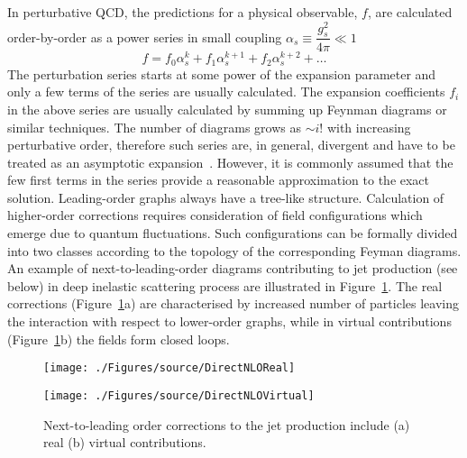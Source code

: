 In perturbative QCD, the predictions for a physical observable, $f$, are calculated order-by-order as a power series in small coupling $\alpha_s \equiv \dfrac{g_s^2}{4\pi} \ll 1$
\begin{equation}
   f=f_{0}\alpha^{k}_s + f_{1}\alpha^{k+1}_s + f_{2}\alpha^{k+2}_s + \ldots
	 \label{eq:pertseries}
\end{equation}
The perturbation series starts at some power of the expansion parameter and only a few terms of the series are usually calculated. The expansion coefficients $f_i$ in the above series are usually calculated by summing up Feynman diagrams or similar techniques. The number of diagrams grows as $\sim i!$ with increasing perturbative order, therefore such series are, in general, divergent and have to be treated as an asymptotic expansion~\cite{Ioffe:2010zz}. However, it is commonly assumed that the few first terms in the series provide a reasonable approximation to the exact solution. Leading-order graphs always have a tree-like structure. Calculation of higher-order corrections requires consideration of field configurations which emerge due to quantum fluctuations. Such configurations can be formally divided into two classes according to the topology of the corresponding Feyman diagrams. An example of next-to-leading-order diagrams contributing to jet production (see below) in deep inelastic scattering process are illustrated in Figure~\ref{fig:nlojetfeyn}. The real corrections (Figure~\ref{fig:nlojetfeyn}a) are characterised by increased number of particles leaving the interaction with respect to lower-order graphs, while in virtual contributions (Figure~\ref{fig:nlojetfeyn}b) the fields form closed loops.
 
\begin{figure}[h]
	\begin{subfloat}[]{
		\texttt{[image: ./Figures/source/DirectNLOReal]}
		\label{fig:nlojetfeynvirtual}
	 }%
	\end{subfloat}\hfill
	\begin{subfloat}[]{
		\texttt{[image: ./Figures/source/DirectNLOVirtual]}
		\label{fig:nlojetfeynreal}
	}%
	\end{subfloat}
\caption{Next-to-leading order corrections to the jet production include (a) real (b) virtual contributions.}
\label{fig:nlojetfeyn}
\end{figure}

